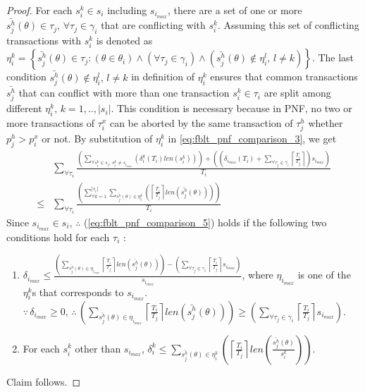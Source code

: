 \documentclass[12pt,english]{report}
\newtheorem{proof}{Proof}
\begin{document}
\begin{proof}
For each $s_{i}^{k}\in s_{i}$ including $s_{i_{max}}$, there are
a set of one or more $\bar{s_{j}^{h}}(\theta)\in\tau_{j},\,\forall\tau_{j}\in\gamma_{i}$
that are conflicting with $s_{i}^{k}$. Assuming this set of conflicting
transactions with $s_{i}^{k}$ is denoted as $\eta_{i}^{k}=\left\{ \bar{s_{j}^{h}}(\theta)\in\tau_{j}:\left(\theta\in\theta_{i}\right)\wedge\left(\forall\tau_{j}\in\gamma_{i}\right)\wedge\left(\bar{s_{j}^{h}}(\theta)\not\in\eta_{i}^{l},\, l\ne k\right)\right\} $.
The last condition $\bar{s_{j}^{h}}(\theta)\not\in\eta_{i}^{l},\, l\ne k$
in definition of $\eta_{i}^{k}$ ensures that common transactions
$\bar{s_{j}^{h}}$ that can conflict with more than one transaction
$s_{i}^{k}\in\tau_{i}$ are split among different $\eta_{i}^{k},\, k=1,..,|s_{i}|$.
This condition is necessary because in PNF, no two or more transactions
of $\tau_{i}^{x}$ can be aborted by the same transaction of $\tau_{j}^{h}$
whether $p_{j}^{h}>p_{i}^{x}$ or not. By substitution of $\eta_{i}^{k}$
in \ref{eq:fblt_pnf_comparison_3}, we get 
\begin{eqnarray}
 & \sum_{\forall\tau_{i}}\frac{\left(\sum_{\forall s_{i}^{k}\in s_{i},\, s_{i}^{k}\ne s_{i_{max}}}\left(\delta_{i}^{k}(T_{i})len(s_{i}^{k})\right)\right)+\left(\left(\delta_{i_{max}}(T_{i})+\sum_{\forall\tau_{j}\in\gamma_{i}}\left\lceil \frac{T_{i}}{T_{j}}\right\rceil \right)s_{i_{max}}\right)}{T_{i}}\label{eq:fblt_pnf_comparison_5}\\
\le & \sum_{\forall\tau_{i}}\frac{\left(\sum_{\forall k=1}^{|s_{i}|}\sum_{\bar{s_{j}^{h}}(\theta)\in\eta_{i}^{k}}\left(\left\lceil \frac{T_{i}}{T_{j}}\right\rceil len\left(\bar{s_{j}^{h}}(\theta)\right)\right)\right)}{T_{i}}\nonumber 
\end{eqnarray}
Since $s_{i_{max}}\in s_{i}$, $\therefore$ (\ref{eq:fblt_pnf_comparison_5})
holds if the following two conditions hold for each $\tau_{i}$ :
\begin{enumerate}
\item $\delta_{i_{max}}\le\frac{\left(\sum_{\bar{s_{j}^{h}}(\theta)\in\eta_{i_{max}}}\left\lceil \frac{T_{i}}{T_{j}}\right\rceil len\left(\bar{s_{j}^{h}}(\theta)\right)\right)-\left(\sum_{\forall\tau_{j}\in\gamma_{i}}\left\lceil \frac{T_{i}}{T_{j}}\right\rceil s_{i_{max}}\right)}{s_{i_{max}}}$,
where $\eta_{i_{max}}$ is one of the $\eta_{i}^{k}$s that corresponds
to $s_{i_{max}}$. $\because\,\delta_{i_{max}}\ge0,\,\therefore\,\left(\sum_{\bar{s_{j}^{h}}(\theta)\in\eta_{i_{max}}}\left\lceil \frac{T_{i}}{T_{j}}\right\rceil len\left(\bar{s_{j}^{h}}(\theta)\right)\right)\ge\left(\sum_{\forall\tau_{j}\in\gamma_{i}}\left\lceil \frac{T_{i}}{T_{j}}\right\rceil s_{i_{max}}\right)$.
\item For each $s_{i}^{k}$ other than $s_{i_{max}}$, $\delta_{i}^{k}\le\sum_{\bar{s_{j}^{h}}(\theta)\in\eta_{i}^{k}}\left(\left\lceil \frac{T_{i}}{T_{j}}\right\rceil len\left(\frac{\bar{s_{j}^{h}}(\theta)}{s_{i}^{k}}\right)\right)$.
\end{enumerate}
Claim follows.

\end{proof}
\end{document}
